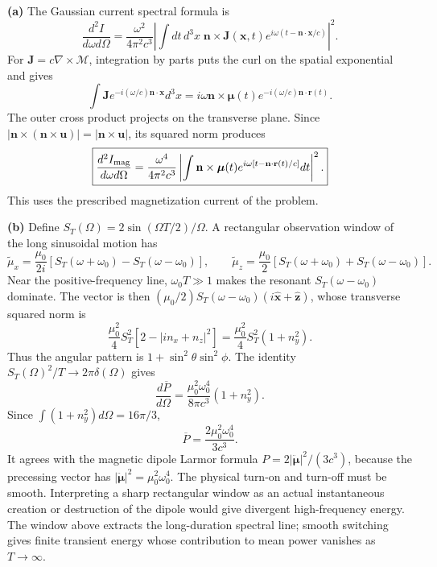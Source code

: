 \textbf{(a)} The Gaussian current spectral formula is
\[
\frac{d^2I}{d\omega d\Omega}
=\frac{\omega^2}{4\pi^2c^3}
\left|\int dt\,d^3x\;\mathbf n\times\mathbf J(\mathbf x,t)
 e^{i\omega(t-\mathbf n\cdot\mathbf x/c)}\right|^2.
\]
For $\mathbf J=c\nabla\times\boldsymbol{\mathcal M}$, integration by
parts puts the curl on the spatial exponential and gives
\[
\int\mathbf J e^{-i(\omega/c)\mathbf n\cdot\mathbf x}d^3x
=i\omega\mathbf n\times\boldsymbol\mu(t)
 e^{-i(\omega/c)\mathbf n\cdot\mathbf r(t)}.
\]
The outer cross product projects on the transverse plane. Since
$|\mathbf n\times(\mathbf n\times\mathbf u)|=|\mathbf n\times\mathbf u|$,
its squared norm produces
\[
\boxed{\frac{d^2I_{\rm mag}}{d\omega d\Omega}
=\frac{\omega^4}{4\pi^2c^3}
\left|\int\mathbf n\times\boldsymbol\mu(t)
 e^{i\omega[t-\mathbf n\cdot\mathbf r(t)/c]}dt\right|^2.}
\]
This uses the prescribed magnetization current of the problem.

\textbf{(b)} Define $S_T(\Omega)=2\sin(\Omega T/2)/\Omega$.
A rectangular observation window of the long sinusoidal motion has
\[
\widetilde\mu_x=\frac{\mu_0}{2i}
[S_T(\omega+\omega_0)-S_T(\omega-\omega_0)],\qquad
\widetilde\mu_z=\frac{\mu_0}{2}
[S_T(\omega+\omega_0)+S_T(\omega-\omega_0)].
\]
Near the positive-frequency line, $\omega_0T\gg1$ makes the resonant
$S_T(\omega-\omega_0)$ dominate. The vector is then
$(\mu_0/2)S_T(\omega-\omega_0)(i\hat{\mathbf x}+\hat{\mathbf z})$,
whose transverse squared norm is
\[
\frac{\mu_0^2}{4}S_T^2
[2-|in_x+n_z|^2]
=\frac{\mu_0^2}{4}S_T^2(1+n_y^2).
\]
Thus the angular pattern is $1+\sin^2\theta\sin^2\phi$.
The identity $S_T(\Omega)^2/T\to2\pi\delta(\Omega)$ gives
\[
\frac{d\overline P}{d\Omega}
=\frac{\mu_0^2\omega_0^4}{8\pi c^3}(1+n_y^2).
\]
Since $\int(1+n_y^2)d\Omega=16\pi/3$,
\[
\boxed{\overline P=\frac{2\mu_0^2\omega_0^4}{3c^3}.}
\]
It agrees with the magnetic dipole Larmor formula
$P=2|\ddot{\boldsymbol\mu}|^2/(3c^3)$, because the precessing vector
has $|\ddot{\boldsymbol\mu}|^2=\mu_0^2\omega_0^4$.
The physical turn-on and turn-off must be smooth. Interpreting a sharp
rectangular window as an actual instantaneous creation or destruction
of the dipole would give divergent high-frequency energy. The window
above extracts the long-duration spectral line; smooth switching gives
finite transient energy whose contribution to mean power vanishes as
$T\to\infty$.

